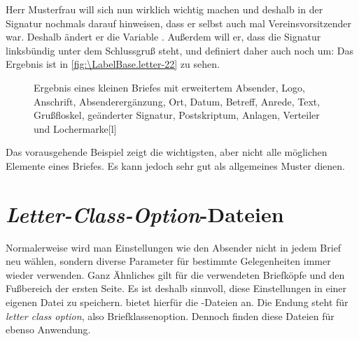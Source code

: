 \begin{Example}
  Herr Musterfrau will sich nun wirklich wichtig machen und deshalb in der
  Signatur nochmals darauf hinweisen, dass er selbst auch mal
  Vereinsvorsitzender war. Deshalb ändert er die Variable
  . Außerdem will er, dass die Signatur
  linksbündig unter dem Schlussgruß steht, und definiert daher auch noch
   um:%
  Das Ergebnis ist in \autoref{fig:\LabelBase.letter-22} zu sehen.
  \begin{figure}
    \setcapindent{0pt}%
    \begin{captionbeside}{Ergebnis eines kleinen Briefes mit erweitertem Absender,
        Logo, Anschrift, Absenderergänzung, Ort, Datum, Betreff,
        Anrede, Text, Grußfloskel, geänderter Signatur, Postskriptum, Anlagen,
        Verteiler und Lochermarke}[l]
    \end{captionbeside}
    \label{fig:\LabelBase.letter-22}
  \end{figure}
\end{Example}

\iftrue%
  Das vorausgehende Beispiel zeigt die wichtigsten, aber nicht alle möglichen
  Elemente eines Briefes. Es kann jedoch sehr gut als allgemeines Muster
  dienen.%
\fi
%
\EndIndexGroup
%
\EndIndexGroup

\section{\emph{Letter-Class-Option}-Dateien}
%
\BeginIndexGroup
{}%
%

Normalerweise wird man Einstellungen wie den Absender nicht in jedem Brief neu
wählen, sondern diverse Parameter für bestimmte Gelegenheiten immer wieder
verwenden. Ganz Ähnliches gilt für die verwendeten Briefköpfe und den
Fußbereich der ersten Seite. Es ist deshalb sinnvoll, diese Einstellungen in
einer eigenen Datei zu speichern. \KOMAScript{} bietet
hierfür die -Dateien an. Die Endung  steht
für \emph{\emph{l}etter \emph{c}lass \emph{o}ption}, also
Briefklassenoption. Dennoch finden diese Dateien für 
ebenso Anwendung.

